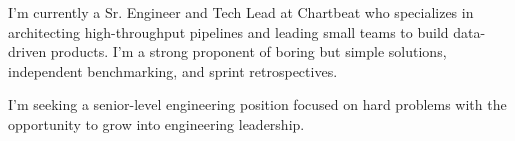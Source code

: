 
\begin{cvparagraph}

	I'm currently a Sr. Engineer and Tech Lead at Chartbeat who specializes in architecting high-throughput pipelines and leading small teams to build data-driven products. I'm a strong proponent of boring but simple solutions, independent benchmarking, and sprint retrospectives.
	
	I'm seeking a senior-level engineering position focused on hard problems with the opportunity to grow into engineering leadership.
	
\end{cvparagraph}


